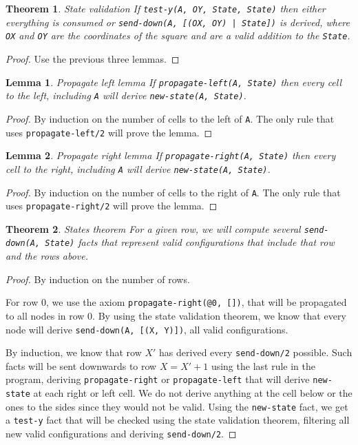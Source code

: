 \documentclass[9pt]{article}
\newtheorem{theorem}{Theorem}
\newtheorem{lemma}{Lemma}
\begin{document}
\begin{theorem}{State validation}
If \texttt{test-y(A, OY, State, State)} then either everything is consumed or \texttt{send-down(A, [(OX, OY) | State])} is derived, where \texttt{OX} and \texttt{OY} are the coordinates of the square and are a valid addition to the \texttt{State}.
\end{theorem}
\begin{proof}
Use the previous three lemmas.
\end{proof}

\begin{lemma}{Propagate left lemma}
If \texttt{propagate-left(A, State)} then every cell to the left, including \texttt{A} will derive \texttt{new-state(A, State)}.
\end{lemma}
\begin{proof}
By induction on the number of cells to the left of \texttt{A}. The only rule that uses \texttt{propagate-left/2} will prove the lemma.
\end{proof}

\begin{lemma}{Propagate right lemma}
If \texttt{propagate-right(A, State)} then every cell to the right, including \texttt{A} will derive \texttt{new-state(A, State)}.
\end{lemma}
\begin{proof}
By induction on the number of cells to the right of \texttt{A}. The only rule that uses \texttt{propagate-right/2} will prove the lemma.
\end{proof}

\begin{theorem}{States theorem}
For a given row, we will compute several \texttt{send-down(A, State)} facts that represent valid configurations that include that row and the rows above.
\end{theorem}
\begin{proof}
By induction on the number of rows.

For row 0, we use the axiom \texttt{propagate-right(@0, [])}, that will be propagated to all nodes in row 0. By using the state validation theorem, we know that every node will derive \texttt{send-down(A, [(X, Y)])}, all valid configurations.


By induction, we know that row $X'$ has derived every \texttt{send-down/2} possible. Such facts will be sent downwards to row $X = X' + 1$ using the last rule in the program, deriving \texttt{propagate-right} or \texttt{propagate-left} that will derive \texttt{new-state} at each right or left cell. We do not derive anything at the cell below or the ones to the sides since they would not be valid. Using the \texttt{new-state} fact, we get a \texttt{test-y} fact that will be checked using the state validation theorem, filtering all new valid configurations and deriving \texttt{send-down/2}.
\end{proof}
\end{document}
